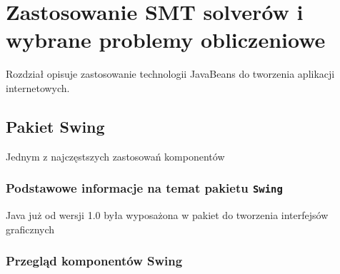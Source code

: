 \chapter{Zastosowanie SMT solverów i wybrane problemy obliczeniowe}
Rozdział opisuje zastosowanie technologii JavaBeans do tworzenia aplikacji
internetowych.
\section{Pakiet Swing}
Jednym z najczęstszych zastosowań komponentów 
\subsection{Podstawowe informacje na temat pakietu \texttt{Swing}}
Java już od wersji 1.0 była wyposażona w pakiet do tworzenia interfejsów graficznych
\subsection{Przegląd komponentów Swing}